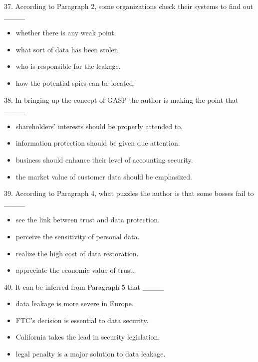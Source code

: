\documentclass[UTF8,11pt]{ctexart}
\begin{document}
37. According to Paragraph 2, some organizations check their systems to find out \_\_\_\_


\begin{itemize}[leftmargin=2em,itemsep=.2em,topsep=.4em]\item[A.] whether there is any weak point.
\item[B.] what sort of data has been stolen.
\item[C.] who is responsible for the leakage.
\item[D.] how the potential spies can be located.
\end{itemize}

38. In bringing up the concept of GASP the author is making the point that \_\_\_\_


\begin{itemize}[leftmargin=2em,itemsep=.2em,topsep=.4em]\item[A.] shareholders’ interests should be properly attended to.
\item[B.] information protection should be given due attention.
\item[C.] business should enhance their level of accounting security.
\item[D.] the market value of customer data should be emphasized.
\end{itemize}

39. According to Paragraph 4, what puzzles the author is that some bosses fail to \_\_\_\_


\begin{itemize}[leftmargin=2em,itemsep=.2em,topsep=.4em]\item[A.] see the link between trust and data protection.
\item[B.] perceive the sensitivity of personal data.
\item[C.] realize the high cost of data restoration.
\item[D.] appreciate the economic value of trust.
\end{itemize}

40. It can be inferred from Paragraph 5 that \_\_\_\_


\begin{itemize}[leftmargin=2em,itemsep=.2em,topsep=.4em]\item[A.] data leakage is more severe in Europe.
\item[B.] FTC’s decision is essential to data security.
\item[C.] California takes the lead in security legislation.
\item[D.] legal penalty is a major solution to data leakage.
\end{itemize}
\end{document}
